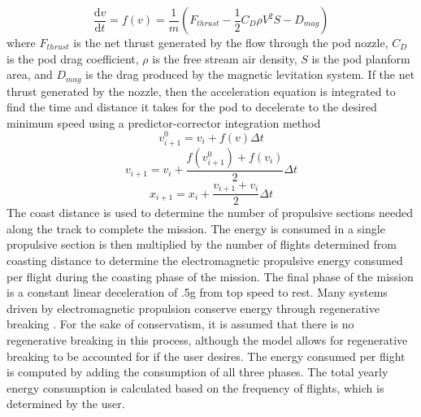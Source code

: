 	\begin{equation}
		\label{eq:acceleration}
		\frac{\mathrm{d} v}{\mathrm{d} t} = f ( v  ) = \frac{1}{m} ( F_{thrust} - \frac{1}{2}C_{D}\rho V^{2}S - D_{mag})
	\end{equation}
	where $F_{thrust}$ is the net thrust generated by the flow through the pod nozzle, $C_D$  is the pod drag coefficient, $\rho$ is the free stream air density, $S$ is the pod planform area, and $D_{mag}$ is the drag produced by the magnetic levitation system. If the net thrust generated by the nozzle, then the acceleration equation is integrated to find the time and distance it takes for the pod to decelerate to the desired minimum speed using a predictor-corrector integration method 
	\begin{equation}
		\label{eq:predictor_corrector}
		v_{i+1}^{0} = v_{i}+f(v)\Delta t
	\end{equation}
	\begin{equation}
		\label{eq:predictor_corrector_2}
		v_{i+1} = v_{i}+\frac{f(v_{i+1}^{0})+f(v_{i})}{2}\Delta t
	\end{equation}
	\begin{equation}
		\label{eq:predictor_corrector_3}
		x_{i+1} = x_{i}+\frac{v_{i+1}+v_{i}}{2}\Delta t
	\end{equation}
	The coast distance is used to determine the number of propulsive sections needed along the track to complete the mission. The energy is consumed in a single propulsive section is then multiplied by the number of flights determined from coasting distance to determine the electromagnetic propulsive energy consumed per flight during the coasting phase of the mission. The final phase of the mission is a constant linear deceleration of .5g from top speed to rest. Many systems driven by electromagnetic propulsion conserve energy through regenerative breaking \cite{inductrack}. For the sake of conservatism, it is assumed that there is no regenerative breaking in this process, although the model allows for regenerative breaking to be accounted for if the user desires. The energy consumed per flight is computed by adding the consumption of all three phases. The total yearly energy consumption is calculated based on the frequency of flights, which is determined by the user.

